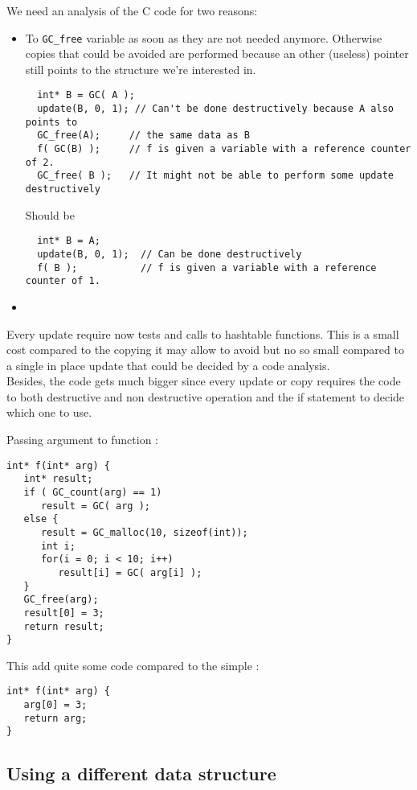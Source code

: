 \documentclass[12pt,a4paper]{article}
\newcommand{\cl}[1]{\texttt{#1}}
\begin{document}
We need an analysis of the C code for two reasons:
\begin{itemize}
\item To \cl{GC\_free} variable as soon as they are not needed anymore. Otherwise copies that could be avoided are performed because an other (useless) pointer still points to the structure we're interested in.
\begin{lstlisting}
  int* B = GC( A );
  update(B, 0, 1); // Can't be done destructively because A also points to
  GC_free(A);     // the same data as B
  f( GC(B) );     // f is given a variable with a reference counter of 2.
  GC_free( B );   // It might not be able to perform some update destructively
\end{lstlisting}
Should be
\begin{lstlisting}
  int* B = A;
  update(B, 0, 1);  // Can be done destructively
  f( B );           // f is given a variable with a reference counter of 1.
\end{lstlisting}
\item 
\end{itemize}

Every update require now tests and calls to hashtable functions. This is a small cost compared to the copying it may allow to avoid but no so small compared to a single in place update that could be decided by a code analysis.\\

Besides, the code gets much bigger since every update or copy requires the code to both destructive and non destructive operation and the if statement to decide which one to use.

Passing argument to function :
\begin{lstlisting}
int* f(int* arg) {
   int* result;
   if ( GC_count(arg) == 1)
      result = GC( arg );
   else {
      result = GC_malloc(10, sizeof(int));
      int i;
      for(i = 0; i < 10; i++)
         result[i] = GC( arg[i] );
   }
   GC_free(arg);
   result[0] = 3;
   return result;
}
\end{lstlisting}

This add quite some code compared to the simple :

\begin{lstlisting}
int* f(int* arg) {
   arg[0] = 3;
   return arg;
}
\end{lstlisting}




\subsection{Using a different data structure}
\end{document}
